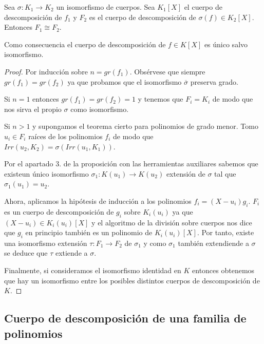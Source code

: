 \begin{theorem}
	Sea $\sigma:K_1 \to K_2$ un isomorfismo de cuerpos. Sea $K_1[X]$ el cuerpo de descomposición de $f_1$ y $F_2$ es el cuerpo de descomposición de $\sigma(f) \in K_2[X]$. Entonces $F_1 \cong F_2$. 
	

	Como consecuencia el cuerpo de descomposición de $f \in K[X]$ es único salvo isomorfismo.
\end{theorem}
\begin{proof}
	Por inducción sobre $n = gr(f_1)$. Obsérvese que siempre $gr(f_1) = gr(f_2)$ ya que probamos que el isomorfismo $\overline{\sigma}$ preserva grado. 
	
	Si $n = 1$ entonces $gr(f_1) = gr(f_2) = 1$ y tenemos que $F_i = K_i$ de modo que nos sirva el propio $\sigma$ como isomorfismo. 
	
	Si $n > 1$ y supongamos el teorema cierto para polinomios de grado menor. Tomo $u_i \in F_i$ raíces de los polinomios $f_i$ de modo que $Irr(u_2,K_2) = \sigma(Irr(u_1,K_1))$.
	
	Por el apartado 3. de la proposición con las herramientas auxiliares sabemos que existeun único isomorfismo $\sigma_1:K(u_1) \to K(u_2)$ extensión de $\sigma$ tal que $\sigma_1(u_1) = u_2$. 
	
	Ahora, aplicamos la hipótesis de inducción a los polinomios $f_i = (X-u_i)g_i$. $F_i$ es un cuerpo de descomposición de $g_i$ sobre $K_i(u_i)$ ya que $(X-u_i) \in K_i(u_i)[X]$ y el algoritmo de la división sobre cuerpos nos dice que $g_i$ en principio también es un polinomio de $K_i(u_i)[X]$. Por tanto, existe una isomorfismo extensión $\tau:F_1 \to F_2$ de $\sigma_1$ y como $\sigma_1$ también extendiende a $\sigma$ se deduce que $\tau$ extiende a $\sigma$. 
	
	Finalmente, si consideramos el isomorfismo identidad en $K$ entonces obtenemos que hay un isomorfismo entre los posibles distintos cuerpos de descomposición de $K$.
\end{proof}

\subsection{Cuerpo de descomposición de una familia de polinomios}


